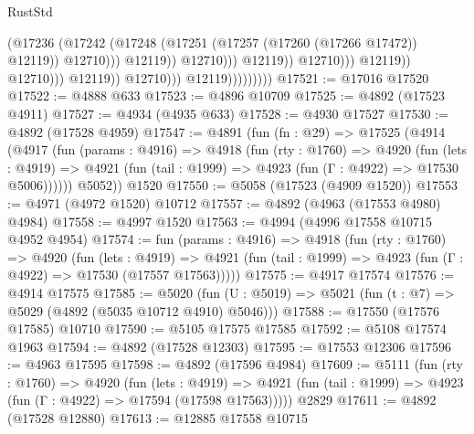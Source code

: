 \begin{lexlean}{RustStd}
\begin{coremodule}
                                                              (@17236
                                                                (@17242
                                                                  (@17248
                                                                    (@17251
                                                                      (@17257
                                                                        (@17260 (@17266 @17472))
                                                                        @12119))
                                                                    @12710)))
                                                              @12119))
                                                          @12710)))
                                                    @12119))
                                                @12710)))
                                          @12119))
                                      @12710)))
                                @12119))
                            @12710)))
                      @12119)))))))))
@17521 := @17016 @17520
@17522 := @4888 @633
@17523 := @4896 @10709
@17525 := @4892 (@17523 @4911)
@17527 := @4934 (@4935 @633)
@17528 := @4930 @17527
@17530 := @4892 (@17528 @4959)
@17547 := @4891
    (fun (fn : @29) =>
    @17525
      (@4914
        (@4917
          (fun (params : @4916) =>
          @4918
            (fun (rty : @1760) =>
            @4920
              (fun (lets : @4919) =>
              @4921 (fun (tail : @1999) => @4923 (fun (Γ : @4922) => @17530 @5006))))))
        @5052))
    @1520
@17550 := @5058 (@17523 (@4909 @1520))
@17553 := @4971 (@4972 @1520) @10712
@17557 := @4892 (@4963 (@17553 @4980) @4984)
@17558 := @4997 @1520
@17563 := @4994 (@4996 @17558 @10715 @4952 @4954)
@17574 := fun (params : @4916) =>
  @4918
    (fun (rty : @1760) =>
    @4920
      (fun (lets : @4919) =>
      @4921 (fun (tail : @1999) => @4923 (fun (Γ : @4922) => @17530 (@17557 @17563)))))
@17575 := @4917 @17574
@17576 := @4914 @17575
@17585 := @5020
    (fun (U : @5019) => @5021 (fun (t : @7) => @5029 (@4892 (@5035 @10712 @4910) @5046)))
@17588 := @17550 (@17576 @17585) @10710
@17590 := @5105 @17575 @17585
@17592 := @5108 @17574 @1963
@17594 := @4892 (@17528 @12303)
@17595 := @17553 @12306
@17596 := @4963 @17595
@17598 := @4892 (@17596 @4984)
@17609 := @5111
    (fun (rty : @1760) =>
    @4920
      (fun (lets : @4919) =>
      @4921 (fun (tail : @1999) => @4923 (fun (Γ : @4922) => @17594 (@17598 @17563)))))
    @2829
@17611 := @4892 (@17528 @12880)
@17613 := @12885 @17558 @10715

\end{coremodule}
\end{lexlean}
